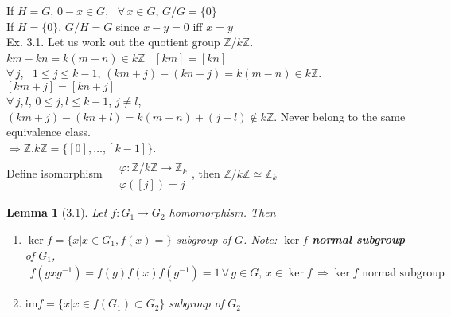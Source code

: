 \documentclass[twoside]{amsart}
\newtheorem{lemma}{Lemma}
\begin{document}
If $H = G$, $0-x \in G$, \, $\forall \, x \in G$, $G/G = \lbrace  0 \rbrace$ \\
If $H = \lbrace 0 \rbrace$, $G/H = G$ since $x-y = 0$ iff $x=y$  \\

Ex. 3.1. Let us work out the quotient group $\mathbb{Z}/ k\mathbb{Z}$.  \\
$km - kn = k (m-n) \in k \mathbb{Z}$  \, $[km ] = [kn]$ \\

$\forall \, j$, \, $1 \leq j \leq k-1$, $(km + j) - (kn +j) = k(m-n) \in k \mathbb{Z}$.  $[km + j ] = [kn +j ]$ \\
$\forall \, j, l$, $0\leq j , l \leq k -1$, $j\neq l$, $(km+j) - (kn +l) = k(m-n) + (j-l ) \notin k\mathbb{Z}$.  Never belong to the same equivalence class.  \\

$\Longrightarrow \mathbb{Z}. k \mathbb{Z} = \lbrace [0], \dots, [k-1] \rbrace$.  \\
Define isomorphism $\begin{aligned} & \quad \\ 
  & \varphi : \mathbb{Z}/ k\mathbb{Z} \to \mathbb{Z}_k \\
  & \varphi([j]) = j \end{aligned}$, then $\mathbb{Z}/ k\mathbb{Z} \simeq \mathbb{Z}_k$  

\begin{lemma}[3.1] Let $f:G_1 \to G_2$ homomorphism.  Then
\begin{enumerate}
\item[(a)] $\ker{f} = \lbrace x | x \in G_1, f(x) = \rbrace$ subgroup of $G$.  Note: $\ker{f}$ \textbf{normal subgroup} of $G_1$, \\
$\begin{gathered}
  f(gxg^{-1}) = f(g)f(x) f(g^{-1}) = 1 \, \forall \, g \in G, \, x\in \ker{f}  \, \Longrightarrow \ker{f} \text{ normal subgroup }
\end{gathered}$
\item[(b)] $\text{im}{f} = \lbrace x | x \in f(G_1) \subset G_2 \rbrace$ subgroup of $G_2$
\end{enumerate}
\end{lemma}
\end{document}
